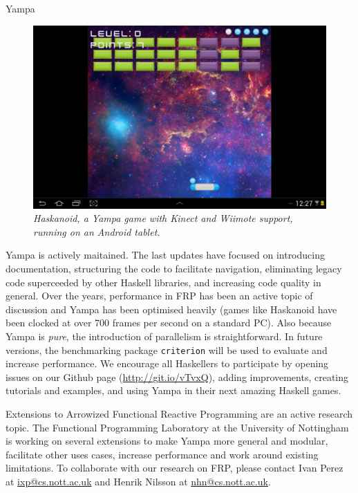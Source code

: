 \begin{hcarentry}{Yampa}
\begin{figure}[h]
\begin{center}
\includegraphics[width=\linewidth]{androidbreakout}
\caption*{\textit{Haskanoid, a Yampa game with Kinect and Wiimote support,
running on an Android tablet.}}
\end{center}
\end{figure}


Yampa is actively maitained. The last updates have focused on introducing
documentation, structuring the code to facilitate navigation, eliminating
legacy code superceeded by other Haskell libraries, and increasing code quality
in general. Over the years, performance in FRP has been an active topic of
discussion and Yampa has been optimised heavily (games like Haskanoid have been
clocked at over 700 frames per second on a standard PC). Also because Yampa is
\emph{pure}, the introduction of parallelism is straightforward. In future
versions, the benchmarking package \texttt{criterion} will be used to evaluate
and increase performance. We encourage all Haskellers to participate by opening
issues on our Github page (\href{http://git.io/vTvxQ}{http://git.io/vTvxQ}),
adding improvements, creating tutorials and examples, and using Yampa in their
next amazing Haskell games.

Extensions to Arrowized Functional Reactive Programming are an active research
topic. The Functional Programming Laboratory at the University of Nottingham is
working on several extensions to make Yampa more general and modular,
facilitate other uses cases, increase performance and work around existing
limitations. To collaborate with our research on FRP, please contact Ivan Perez
at \href{mailto:ixp@cs.nott.ac.uk}{ixp@cs.nott.ac.uk} and Henrik
Nilsson at \href{mailto:nhn@cs.nott.ac.uk}{nhn@cs.nott.ac.uk}.


\end{hcarentry}
